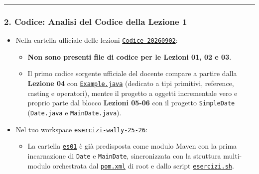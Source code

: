 \documentclass[11pt,a4paper]{article}
\newcommand{\passthrough}[1]{#1}
\providecommand{\tightlist}{\setlength{\itemsep}{0pt}\setlength{\parskip}{0pt}}
\begin{document}
\begin{center}\rule{0.5\linewidth}{0.5pt}\end{center}

\subsubsection{2. Codice: Analisi del Codice della Lezione
1}\label{codice-analisi-del-codice-della-lezione-1}

\begin{itemize}
\tightlist
\item
  Nella cartella ufficiale delle lezioni
  \href{file:///home/wally/Documenti/GitHub/Programmazione-II/25-26/Teoria-e-Esercitazioni/Codice-20260902}{\passthrough{\lstinline!Codice-20260902!}}:

  \begin{itemize}
  \tightlist
  \item
    \textbf{Non sono presenti file di codice per le Lezioni 01, 02 e
    03}.
  \item
    Il primo codice sorgente ufficiale del docente compare a partire
    dalla \textbf{Lezione 04} con
    \href{file:///home/wally/Documenti/GitHub/Programmazione-II/25-26/Teoria-e-Esercitazioni/Codice-20260902/Lezione04/Example.java}{\passthrough{\lstinline!Example.java!}}
    (dedicato a tipi primitivi, reference, casting e operatori), mentre
    il progetto a oggetti incrementale vero e proprio parte dal blocco
    \textbf{Lezioni 05-06} con il progetto
    \passthrough{\lstinline!SimpleDate!}
    (\passthrough{\lstinline!Date.java!} e
    \passthrough{\lstinline!MainDate.java!}).
  \end{itemize}
\item
  Nel tuo workspace
  \href{file:///home/wally/Documenti/GitHub/Programmazione-II/25-26/esercizi-wally-25-26}{\passthrough{\lstinline!esercizi-wally-25-26!}}:

  \begin{itemize}
  \tightlist
  \item
    La cartella
    \href{file:///home/wally/Documenti/GitHub/Programmazione-II/25-26/esercizi-wally-25-26/es01}{\passthrough{\lstinline!es01!}}
    è già predisposta come modulo Maven con la prima incarnazione di
    \passthrough{\lstinline!Date!} e \passthrough{\lstinline!MainDate!},
    sincronizzata con la struttura multi-modulo orchestrata dal
    \href{file:///home/wally/Documenti/GitHub/Programmazione-II/25-26/esercizi-wally-25-26/pom.xml}{\passthrough{\lstinline!pom.xml!}}
    di root e dallo script
    \href{file:///home/wally/Documenti/GitHub/Programmazione-II/25-26/esercizi-wally-25-26/esercizi.sh}{\passthrough{\lstinline!esercizi.sh!}}.
  \end{itemize}
\end{itemize}
\end{document}
